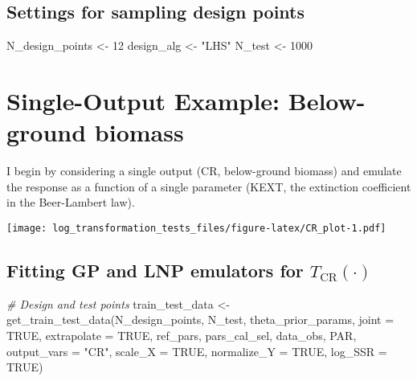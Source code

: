 \documentclass[
]{article}
\newenvironment{Shaded}{\begin{snugshade}}{\end{snugshade}}
\newcommand{\AttributeTok}[1]{\textcolor[rgb]{0.77,0.63,0.00}{#1}}
\newcommand{\CommentTok}[1]{\textcolor[rgb]{0.56,0.35,0.01}{\textit{#1}}}
\newcommand{\ConstantTok}[1]{\textcolor[rgb]{0.00,0.00,0.00}{#1}}
\newcommand{\DecValTok}[1]{\textcolor[rgb]{0.00,0.00,0.81}{#1}}
\newcommand{\FunctionTok}[1]{\textcolor[rgb]{0.00,0.00,0.00}{#1}}
\newcommand{\NormalTok}[1]{#1}
\newcommand{\OtherTok}[1]{\textcolor[rgb]{0.56,0.35,0.01}{#1}}
\newcommand{\StringTok}[1]{\textcolor[rgb]{0.31,0.60,0.02}{#1}}
\begin{document}
\hypertarget{settings-for-sampling-design-points}{%
\subsection{Settings for sampling design
points}\label{settings-for-sampling-design-points}}

\begin{Shaded}
\begin{Highlighting}[]
\NormalTok{N\_design\_points }\OtherTok{\textless{}{-}} \DecValTok{12}
\NormalTok{design\_alg }\OtherTok{\textless{}{-}} \StringTok{"LHS"}
\NormalTok{N\_test }\OtherTok{\textless{}{-}} \DecValTok{1000}
\end{Highlighting}
\end{Shaded}

\hypertarget{single-output-example-below-ground-biomass}{%
\section{Single-Output Example: Below-ground
biomass}\label{single-output-example-below-ground-biomass}}

I begin by considering a single output (CR, below-ground biomass) and
emulate the response as a function of a single parameter (KEXT, the
extinction coefficient in the Beer-Lambert law).

\texttt{[image: log\_transformation\_tests\_files/figure-latex/CR\_plot-1.pdf]}

\hypertarget{fitting-gp-and-lnp-emulators-for-t_textcrcdot}{%
\subsection{\texorpdfstring{Fitting GP and LNP emulators for
\(T_{\text{CR}}(\cdot)\)}{Fitting GP and LNP emulators for T\_\{\textbackslash text\{CR\}\}(\textbackslash cdot)}}\label{fitting-gp-and-lnp-emulators-for-t_textcrcdot}}

\begin{Shaded}
\begin{Highlighting}[]
\CommentTok{\# Design and test points}
\NormalTok{train\_test\_data }\OtherTok{\textless{}{-}} \FunctionTok{get\_train\_test\_data}\NormalTok{(N\_design\_points, N\_test, theta\_prior\_params, }\AttributeTok{joint =} \ConstantTok{TRUE}\NormalTok{, }\AttributeTok{extrapolate =} \ConstantTok{TRUE}\NormalTok{, ref\_pars, }
\NormalTok{                                       pars\_cal\_sel, data\_obs, PAR, }\AttributeTok{output\_vars =} \StringTok{"CR"}\NormalTok{, }\AttributeTok{scale\_X =} \ConstantTok{TRUE}\NormalTok{, }\AttributeTok{normalize\_Y =} \ConstantTok{TRUE}\NormalTok{, }\AttributeTok{log\_SSR =} \ConstantTok{TRUE}\NormalTok{)}
\end{Highlighting}
\end{Shaded}
\end{document}
